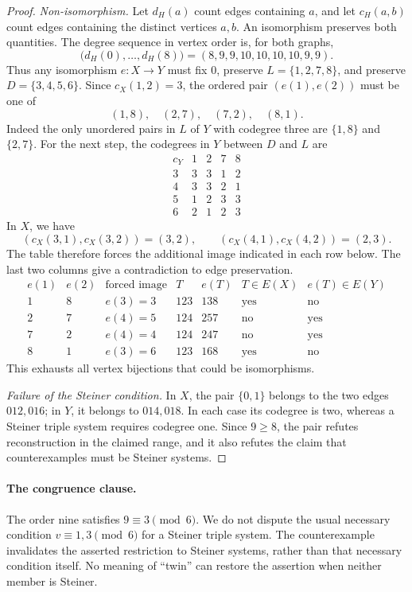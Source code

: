 \documentclass[11pt]{article}
\begin{document}
\begin{proof}
\emph{Non-isomorphism.}
Let $d_H(a)$ count edges containing $a$, and let $c_H(a,b)$ count edges
containing the distinct vertices $a,b$. An isomorphism preserves both
quantities. The degree sequence in vertex order is, for both graphs,
\[
\bigl(d_H(0),\ldots,d_H(8)\bigr)=(8,9,9,10,10,10,10,9,9).
\]
Thus any isomorphism $e:X\longrightarrow Y$ must fix $0$, preserve
$L=\{1,2,7,8\}$, and preserve $D=\{3,4,5,6\}$.
Since $c_X(1,2)=3$, the ordered pair $(e(1),e(2))$ must be one of
\[
(1,8),\quad(2,7),\quad(7,2),\quad(8,1).
\]
Indeed the only unordered pairs in $L$ of $Y$ with codegree three are
$\{1,8\}$ and $\{2,7\}$. For the next step, the codegrees in $Y$ between
$D$ and $L$ are
\[
\begin{array}{c|rrrr}
c_Y&1&2&7&8\\\hline
3&3&3&1&2\\
4&3&3&2&1\\
5&1&2&3&3\\
6&2&1&2&3
\end{array}
\]
In $X$, we have
\[
(c_X(3,1),c_X(3,2))=(3,2),\qquad
(c_X(4,1),c_X(4,2))=(2,3).
\]
The table therefore forces the additional image indicated in each row
below. The last two columns give a contradiction to edge preservation.
\[
\begin{array}{cc|c|cc|cc}
e(1)&e(2)&\text{forced image}&T&e(T)&T\in E(X)&e(T)\in E(Y)\\\hline
1&8&e(3)=3&123&138&\text{yes}&\text{no}\\
2&7&e(4)=5&124&257&\text{no}&\text{yes}\\
7&2&e(4)=4&124&247&\text{no}&\text{yes}\\
8&1&e(3)=6&123&168&\text{yes}&\text{no}
\end{array}
\]
This exhausts all vertex bijections that could be isomorphisms.

\emph{Failure of the Steiner condition.}
In $X$, the pair $\{0,1\}$ belongs to the two edges $012,016$; in $Y$,
it belongs to $014,018$. In each case its codegree is two, whereas a
Steiner triple system requires codegree one. Since $9\geq8$, the pair
refutes reconstruction in the claimed range, and it also refutes the
claim that counterexamples must be Steiner systems.
\end{proof}

\paragraph{The congruence clause.}
The order nine satisfies $9\equiv3\pmod6$. We do not dispute the usual
necessary condition $v\equiv1,3\pmod6$ for a Steiner triple system.
The counterexample invalidates the asserted restriction to Steiner
systems, rather than that necessary condition itself. No meaning of
``twin'' can restore the assertion when neither member is Steiner.
\end{document}
